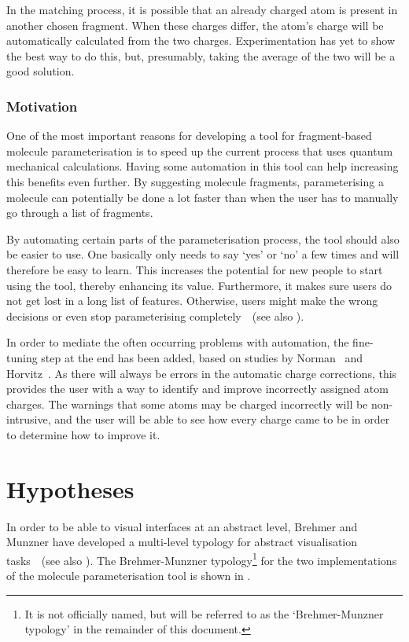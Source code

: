 \noindent
In the matching process, it is possible that an already charged atom is present in another chosen fragment. When these charges differ, the atom's charge will be automatically calculated from the two charges. Experimentation has yet to show the best way to do this, but, presumably, taking the average of the two will be a good solution.

\vspace{-.2cm}
\subsubsection{Motivation}
\vspace{-.2cm}
One of the most important reasons for developing a tool for fragment-based molecule parameterisation is to speed up the current process that uses quantum mechanical calculations. Having some automation in this tool can help increasing this benefits even further. By suggesting molecule fragments, parameterising a molecule can potentially be done a lot faster than when the user has to manually go through a list of fragments.

By automating certain parts of the parameterisation process, the tool should also be easier to use. One basically only needs to say `yes' or `no' a few times and will therefore be easy to learn. This increases the potential for new people to start using the tool, thereby enhancing its value. Furthermore, it makes sure users do not get lost in a long list of features. Otherwise, users might make the wrong decisions or even stop parameterising completely~\cite{norman2002design}~(see also ).

In order to mediate the often occurring problems with automation, the fine-tuning step at the end has been added, based on studies by Norman~\cite{norman1990problem} and Horvitz~\cite{horvitz1999principles}. As there will always be errors in the automatic charge corrections, this provides the user with a way to identify and improve incorrectly assigned atom charges. The warnings that some atoms may be charged incorrectly will be non-intrusive, and the user will be able to see how every charge came to be in order to determine how to improve it.


\vspace{-.2cm}
\section{Hypotheses}
\vspace{-.2cm}
In order to be able to visual interfaces at an abstract level, Brehmer and Munzner have developed a multi-level typology for abstract visualisation tasks~\cite{brehmer2013multi}~(see also ). The Brehmer-Munzner typology\footnote{It is not officially named, but will be referred to as the `Brehmer-Munzner typology' in the remainder of this document.} for the two implementations of the molecule parameterisation tool is shown in .

